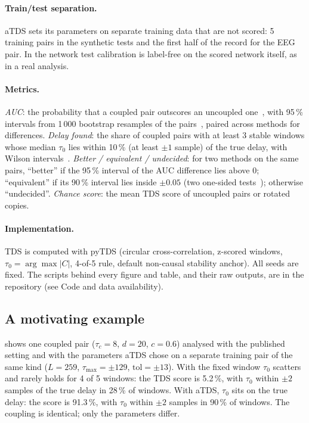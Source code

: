 \documentclass[11pt,a4paper]{article}
\begin{document}
\paragraph{Train/test separation.} aTDS sets its parameters on separate training data that are not scored: 5 training pairs in the synthetic tests and the first half of the record for the EEG pair. In the network test calibration is label-free on the scored network itself, as in a real analysis.

\paragraph{Metrics.} \emph{AUC}: the probability that a coupled pair outscores an uncoupled one~\cite{Hanley1982MeaningUse}, with 95\,\% intervals from 1\,000 bootstrap resamples of the pairs~\cite{Efron1979BootstrapMethods}, paired across methods for differences. \emph{Delay found}: the share of coupled pairs with at least 3 stable windows whose median $\tau_0$ lies within 10\,\% (at least $\pm1$ sample) of the true delay, with Wilson intervals~\cite{Wilson1927ProbableInference}. \emph{Better / equivalent / undecided}: for two methods on the same pairs, ``better'' if the 95\,\% interval of the AUC difference lies above 0; ``equivalent'' if its 90\,\% interval lies inside $\pm0.05$ (two one-sided tests~\cite{Schuirmann1987ComparisonTwo}); otherwise ``undecided''. \emph{Chance score}: the mean TDS score of uncoupled pairs or rotated copies.

\paragraph{Implementation.} TDS is computed with pyTDS (circular cross-correlation, z-scored windows, $\tau_0 = \arg\max|C|$, 4-of-5 rule, default non-causal stability anchor). All seeds are fixed. The scripts behind every figure and table, and their raw outputs, are in the repository (see Code and data availability).

\subsection{A motivating example}
 shows one coupled pair ($\tau_c = 8$, $d = 20$, $c = 0.6$) analysed with the published setting and with the parameters aTDS chose on a separate training pair of the same kind ($L = 259$, $\tau_{\max} = \pm129$, $\mathrm{tol} = \pm13$). With the fixed window $\tau_0$ scatters and rarely holds for 4 of 5 windows: the TDS score is 5.2\,\%, with $\tau_0$ within $\pm2$ samples of the true delay in 28\,\% of windows. With aTDS, $\tau_0$ sits on the true delay: the score is 91.3\,\%, with $\tau_0$ within $\pm2$ samples in 90\,\% of windows. The coupling is identical; only the parameters differ.
\end{document}
